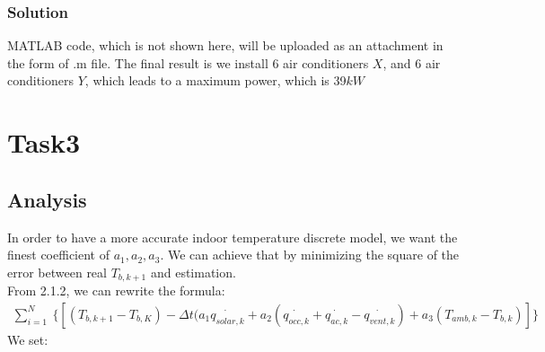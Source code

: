 \documentclass[titlepage,a4paper]{article}
\begin{document}
        \subsubsection{Solution}
            MATLAB code, which is not shown here, will be uploaded as an attachment in the form of .m file. The final result is we install 6 air conditioners $X$, and 6 air conditioners $Y$, which leads to a maximum power, which is 39$kW$
            
    
    

            



\section{Task3}
    \subsection{Analysis}
        In order to have a more accurate indoor temperature discrete model, we want the finest coefficient of $a_1,a_2,a_3$. We can achieve that by minimizing the square of the error between real $T_{b,k+1}$ and estimation.\\
        From 2.1.2, we can rewrite the formula:
        \begin{align}\label{1.10}
            \sum_{i=1}^N \:\{[(T_{b,k+1} - T_{b,K}) - \Delta t (a_1\dot{q_{solar,k}} + a_2(\dot{q_{occ,k}}+\dot{q_{ac,k}}-\dot{q_{vent,k}}) + a_3(T_{amb,k} - T_{b,k}) ]  \}
        \end{align}
        We set:
\end{document}
